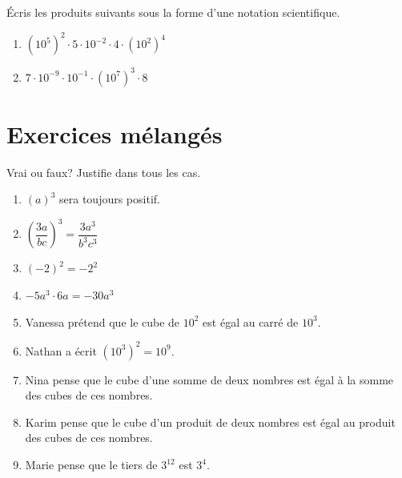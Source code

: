 \documentclass[../../syllabus_2.tex]{subfiles}
\begin{document}
\begin{exercise}
	Écris les produits suivants sous la forme d'une notation scientifique.
	\begin{enumerate}[cols=2]
		\item \(\left(10^5\right)^2\cdot 5\cdot 10^{-2}\cdot 4\cdot \left(10^2\right)^4\)
		\item \(7\cdot 10^{-9}\cdot 10^{-1}\cdot \left(10^7\right)^3\cdot 8\)
	\end{enumerate}
\end{exercise}

\section{Exercices mélangés}
\setcounter{exercise}{0}
\begin{exercise}
	Vrai ou faux? Justifie dans tous les cas.
	\begin{enumerate}
		\item \((a)^3\) sera toujours positif.
		\item \(\left(\dfrac{3a}{bc}\right)^3 =\dfrac{3a^3}{b^3c^3}\)
		\item \((-2)^2=-2^2\)
		\item \(-5a^3\cdot 6a= -30a^3\)
		\item Vanessa prétend que le cube de \(10^2\) est égal au carré de \(10^3\).
		\item Nathan a écrit \((10^3)^2=10^9\).
		\item Nina pense que le cube d'une somme de deux nombres est égal à la somme des cubes de ces nombres.
		\item Karim pense que le cube d'un produit de deux nombres est égal au produit des cubes de ces nombres.
		\item Marie pense que le tiers de \(3^{12}\) est \(3^4\).
	\end{enumerate}
\end{exercise}
\end{document}
